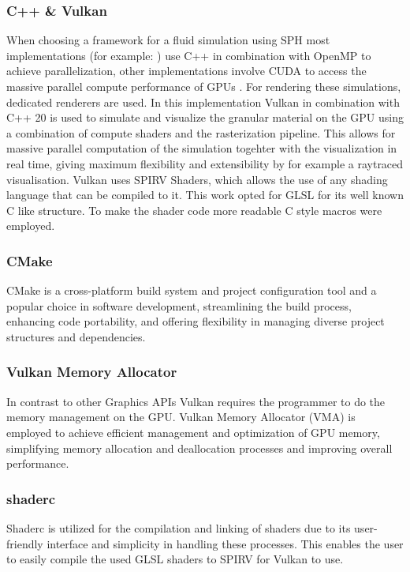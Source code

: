 \documentclass[intern]{cgMA}
\begin{document}
    \subsubsection*{C++ \& Vulkan}
    When choosing a framework for a fluid simulation using SPH most implementations (for example: \cite{splishsplash} \cite{dualsphysics}) use C++ in combination with OpenMP\cite{openmp} to achieve parallelization, other implementations involve CUDA \cite{cuda} to access the massive parallel compute performance of GPUs \cite{dualsphysics}. For rendering these simulations, dedicated renderers are used. In this implementation Vulkan \cite{vulkan} in combination with C++ 20 is used to simulate and visualize the granular material on the GPU using a combination of compute shaders and the rasterization pipeline. This allows for massive parallel computation of the simulation togehter with the visualization in real time, giving maximum flexibility and extensibility by for example a raytraced visualisation. Vulkan uses SPIRV Shaders, which allows the use of any shading language that can be compiled to it. This work opted for GLSL for its well known C like structure. To make the shader code more readable C style macros were employed.

    \subsubsection*{CMake}    
    CMake \cite{cmake} is a cross-platform build system and project configuration tool and a popular choice in software development, streamlining the build process, enhancing code portability, and offering flexibility in managing diverse project structures and dependencies.

    \subsubsection*{Vulkan Memory Allocator}   
    In contrast to other Graphics APIs Vulkan requires the programmer to do the memory management on the GPU. Vulkan Memory Allocator (VMA)\cite{vma} is employed to achieve efficient management and optimization of GPU memory, simplifying memory allocation and deallocation processes and improving overall performance. 

    \subsubsection*{shaderc}   
    Shaderc\cite{shaderc} is utilized for the compilation and linking of shaders due to its user-friendly interface and simplicity in handling these processes. This enables the user to easily compile the used GLSL shaders to SPIRV for Vulkan to use.
\end{document}
